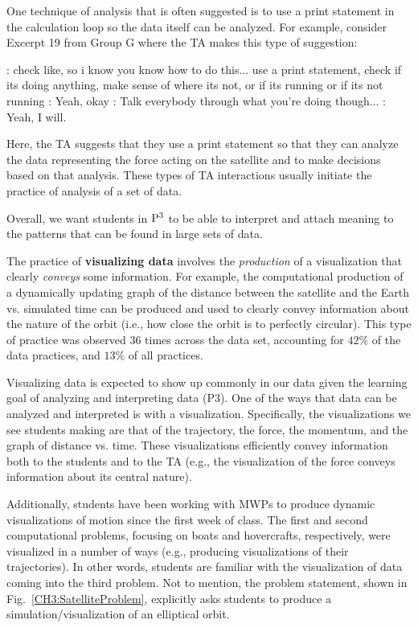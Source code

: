 \documentclass{msuphddissertation}
\begin{document}
\begin{doublespace}
One technique of analysis that is often suggested is to use a print statement in the calculation loop so the data itself can be analyzed.  For example, consider Excerpt 19 from Group G where the TA makes this type of suggestion: \begin{description}
\TA: check like, so i know you know how to do this... use a print statement, check if its doing anything, make sense of where its not, or if its running or if its not running
\SB: Yeah, okay
\TA: Talk everybody through what you're doing though...
\SB: Yeah, I will.\end{description}  Here, the TA suggests that they use a print statement so that they can analyze the data representing the force acting on the satellite and to make decisions based on that analysis.  These types of TA interactions usually initiate the practice of analysis of a set of data.

Overall, we want students in ${\rm P}^{3}$ to be able to interpret and attach meaning to the patterns that can be found in large sets of data.

The practice of \textbf{visualizing data} involves the \textit{production} of a visualization that clearly \textit{conveys} some information.  For example, the computational production of a dynamically updating graph of the distance between the satellite and the Earth vs. simulated time can be produced and used to clearly convey information about the nature of the orbit (i.e., how close the orbit is to perfectly circular).  This type of practice was observed $36$ times across the data set, accounting for $42\%$ of the data practices, and $13\%$ of all practices.

Visualizing data is expected to show up commonly in our data given the learning goal of analyzing and interpreting data (P3).  One of the ways that data can be analyzed and interpreted is with a visualization.  Specifically, the visualizations we see students making are that of the trajectory, the force, the momentum, and the graph of distance vs. time.  These visualizations efficiently convey information both to the students and to the TA (e.g., the visualization of the force conveys information about its central nature).

Additionally, students have been working with MWPs to produce dynamic visualizations of motion since the first week of class.  The first and second computational problems, focusing on boats and hovercrafts, respectively, were visualized in a number of ways (e.g., producing visualizations of their trajectories).  In other words, students are familiar with the visualization of data coming into the third problem.  Not to mention, the problem statement, shown in Fig.~\ref{CH3:SatelliteProblem}, explicitly asks students to produce a simulation/visualization of an elliptical orbit. 


\end{doublespace}
\end{document}
